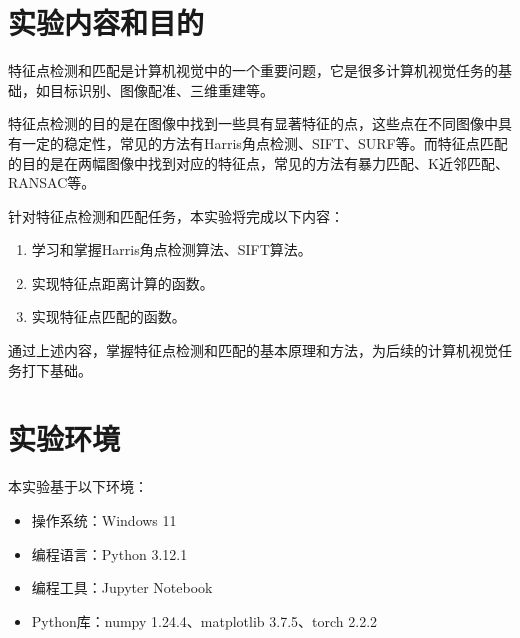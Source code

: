 \section{实验内容和目的}

特征点检测和匹配是计算机视觉中的一个重要问题，它是很多计算机视觉任务的基础，如目标识别、图像配准、三维重建等。

特征点检测的目的是在图像中找到一些具有显著特征的点，这些点在不同图像中具有一定的稳定性，常见的方法有Harris角点检测、SIFT、SURF等。而特征点匹配的目的是在两幅图像中找到对应的特征点，常见的方法有暴力匹配、K近邻匹配、RANSAC等。

针对特征点检测和匹配任务，本实验将完成以下内容：

\begin{enumerate}
    \item 学习和掌握Harris角点检测算法、SIFT算法。
    \item 实现特征点距离计算的函数。
    \item 实现特征点匹配的函数。
\end{enumerate}

通过上述内容，掌握特征点检测和匹配的基本原理和方法，为后续的计算机视觉任务打下基础。

\section{实验环境}

本实验基于以下环境：

\begin{itemize}
    \item 操作系统：Windows 11
    \item 编程语言：Python 3.12.1
    \item 编程工具：Jupyter Notebook
    \item Python库：numpy 1.24.4、matplotlib 3.7.5、torch 2.2.2
\end{itemize}
